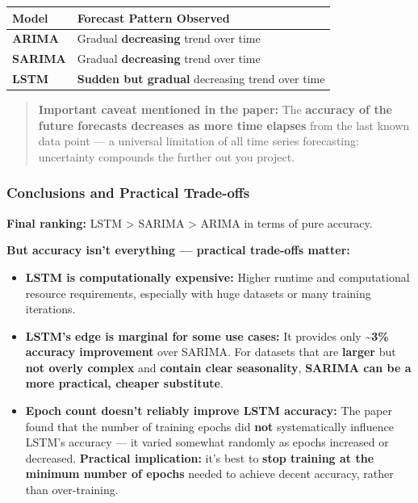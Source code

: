 \documentclass[12pt,openany]{book}
\begin{document}
\begin{center}
\begin{tabular}{|L{0.28\textwidth}|L{0.62\textwidth}|}
\hline
Model & Forecast Pattern Observed \\
\hline
\textbf{ARIMA} & Gradual \textbf{decreasing} trend over time \\
\hline
\textbf{SARIMA} & Gradual \textbf{decreasing} trend over time \\
\hline
\textbf{LSTM} & \textbf{Sudden but gradual} decreasing trend over time \\
\hline
\end{tabular}
\end{center}

\begin{quote}
\textbf{Important caveat mentioned in the paper:} The \textbf{accuracy of the future forecasts decreases as more time elapses} from the last known data point --- a universal limitation of all time series forecasting: uncertainty compounds the further out you project.\par

\end{quote}

\subsubsection{Conclusions and Practical Trade-offs}

\textbf{Final ranking:} LSTM > SARIMA > ARIMA in terms of pure accuracy.

\textbf{But accuracy isn't everything --- practical trade-offs matter:}

\begin{itemize}[leftmargin=*]
    \item \textbf{LSTM is computationally expensive:} Higher runtime and computational resource requirements, especially with huge datasets or many training iterations.
    \item \textbf{LSTM's edge is marginal for some use cases:} It provides only \textasciitilde{}\textbf{3\% accuracy improvement} over SARIMA. For datasets that are \textbf{larger} but \textbf{not overly complex} and \textbf{contain clear seasonality}, \textbf{SARIMA can be a more practical, cheaper substitute}.
    \item \textbf{Epoch count doesn't reliably improve LSTM accuracy:} The paper found that the number of training epochs did \textbf{not} systematically influence LSTM's accuracy --- it varied somewhat randomly as epochs increased or decreased. \textbf{Practical implication:} it's best to \textbf{stop training at the minimum number of epochs} needed to achieve decent accuracy, rather than over-training.
\end{itemize}
\end{document}
